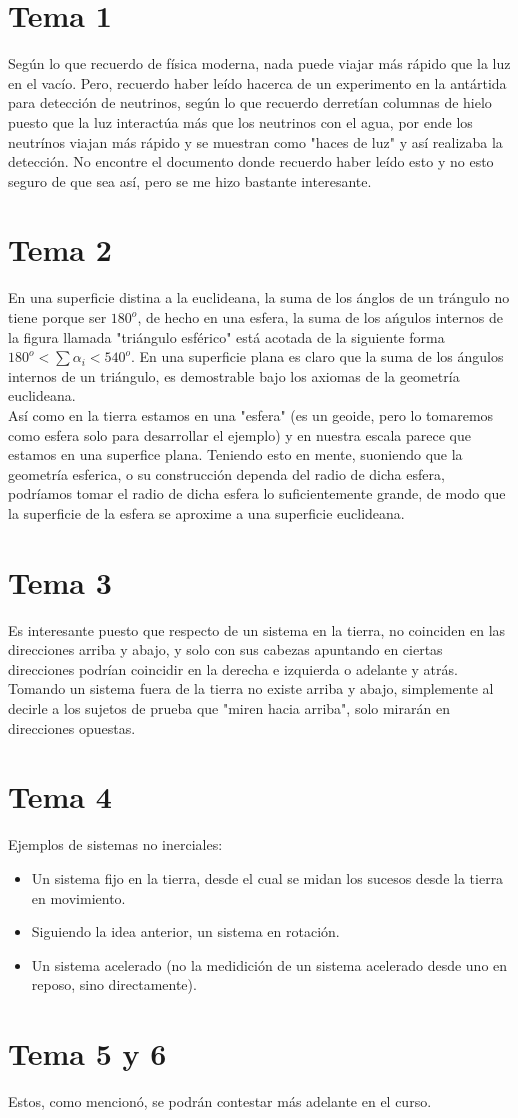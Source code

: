 \section{Tema 1}
Según lo que recuerdo de física moderna, nada puede viajar más rápido que la luz en el vacío. Pero, recuerdo haber leído hacerca de un experimento en la antártida para detección de neutrinos, según lo que recuerdo derretían columnas de hielo puesto que la luz interactúa más que los neutrinos con el agua, por ende los neutrínos viajan más rápido y se muestran como "haces de luz" y así realizaba la detección. No encontre el documento donde recuerdo haber leído esto y no esto seguro de que sea así, pero se me hizo bastante interesante.
\section{Tema 2}
En una superficie distina a la euclideana, la suma de los ánglos de un trángulo no tiene porque ser $180^o$, de hecho en una esfera, la suma de los ańgulos internos de la figura llamada "triángulo esférico" está acotada de la siguiente forma $180^o < \sum \alpha _i < 540 ^o$. En una superficie plana es claro que la suma de los ángulos internos de un triángulo, es demostrable bajo los axiomas de la geometría euclideana.\\
Así como en la tierra estamos en una "esfera" (es un geoide, pero lo tomaremos como esfera solo para desarrollar el ejemplo) y en nuestra escala parece que estamos en una superfice plana. Teniendo esto en mente, suoniendo que la geometría esferica, o su construcción dependa del radio de dicha esfera, podríamos tomar el radio de dicha esfera lo suficientemente grande, de modo que la superficie de la esfera se aproxime a una superficie euclideana.
\section{Tema 3}
Es interesante puesto que respecto de un sistema en la tierra, no coinciden en las direcciones arriba y abajo, y solo con sus cabezas apuntando en ciertas direcciones podrían coincidir en la derecha e izquierda o adelante y atrás. Tomando un sistema fuera de la tierra no existe arriba y abajo, simplemente al decirle a los sujetos de prueba que "miren hacia arriba", solo mirarán en direcciones opuestas.
\section{Tema 4}
Ejemplos de sistemas no inerciales:
	\begin{itemize}
		\item Un sistema fijo en la tierra, desde el cual se midan los sucesos desde la tierra en movimiento.
		\item Siguiendo la idea anterior, un sistema en rotación.
		\item Un sistema acelerado (no la medidición de un sistema acelerado desde uno en reposo, sino directamente).
	\end{itemize}
\section{Tema 5 y 6}
Estos, como mencionó, se podrán contestar más adelante en el curso.